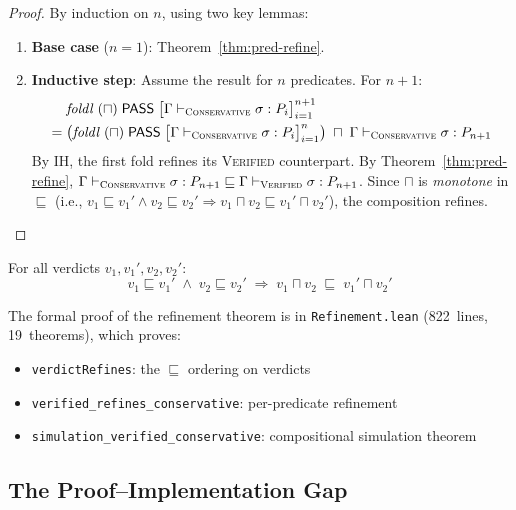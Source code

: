 \documentclass[acmsmall,review,anonymous]{acmart}
\newcommand{\PASS}{\ensuremath{\mathsf{PASS}}\xspace}
\newcommand{\tand}{\sqcap}
\newcommand{\seq}{\sigma}
\newcommand{\pred}{P}
\newcommand{\CONSERVATIVE}{\textsc{Conservative}\xspace}
\newcommand{\VERIFIED}{\textsc{Verified}\xspace}
\newcommand{\evalmode}[4]{#1 \vdash_{#2} #3 : #4}
\newcommand{\foldl}{\mathit{foldl}}    %
\begin{document}
\begin{proof}
By induction on $n$, using two key lemmas:

\begin{enumerate}[leftmargin=*,itemsep=1pt,topsep=1pt]
\item \textbf{Base case} ($n = 1$):
  Theorem~\ref{thm:pred-refine}.

\item \textbf{Inductive step}:
  Assume the result for $n$ predicates.
  For $n + 1$:
  \begin{align*}
    &\foldl\;(\tand)\;\PASS\;
      \bigl[\evalmode{\Gamma}{\CONSERVATIVE}{\seq}{\pred_i}\bigr]_{i=1}^{n+1}
    \\ =\; &
      \bigl(\foldl\;(\tand)\;\PASS\;
        \bigl[\evalmode{\Gamma}{\CONSERVATIVE}{\seq}{\pred_i}\bigr]_{i=1}^{n}\bigr)
      \;\tand\;
      \evalmode{\Gamma}{\CONSERVATIVE}{\seq}{\pred_{n+1}}
  \end{align*}
  By IH, the first fold refines its \VERIFIED{} counterpart.
  By Theorem~\ref{thm:pred-refine},
  $\evalmode{\Gamma}{\CONSERVATIVE}{\seq}{\pred_{n+1}}
   \sqsubseteq
   \evalmode{\Gamma}{\VERIFIED}{\seq}{\pred_{n+1}}$.
  Since $\tand$ is \emph{monotone} in $\sqsubseteq$ (i.e.,
  $v_1 \sqsubseteq v_1' \wedge v_2 \sqsubseteq v_2'
   \Rightarrow v_1 \tand v_2 \sqsubseteq v_1' \tand v_2'$),
  the composition refines.\qedhere
\end{enumerate}
\end{proof}

\begin{lemma}[$\tand$-monotonicity in $\sqsubseteq$]\label{lem:tand-mono}
For all verdicts $v_1, v_1', v_2, v_2'$:
\[
  v_1 \sqsubseteq v_1' \;\wedge\; v_2 \sqsubseteq v_2'
  \;\Longrightarrow\;
  v_1 \tand v_2 \;\sqsubseteq\; v_1' \tand v_2'
\]
\end{lemma}

The formal proof of the refinement theorem is in
\texttt{Refinement.lean} (822~lines, 19~theorems), which proves:
\begin{itemize}[leftmargin=*,itemsep=0pt,topsep=1pt]
\item \texttt{verdictRefines}: the $\sqsubseteq$ ordering on verdicts
\item \texttt{verified\_refines\_conservative}: per-predicate refinement
\item \texttt{simulation\_verified\_conservative}: compositional
      simulation theorem
\end{itemize}

\subsection{The Proof--Implementation Gap}\label{sec:gap}
\end{document}

